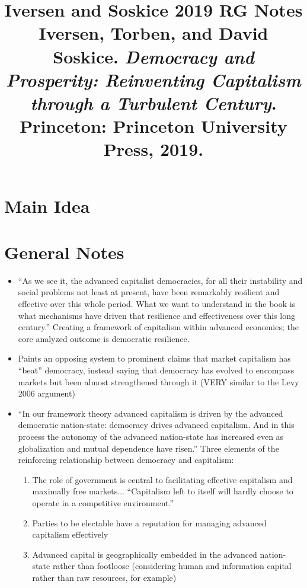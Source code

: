 \documentclass[12pt]{article}
\title{\textbf{Iversen and Soskice 2019 RG Notes}\\
\large Iversen, Torben, and David Soskice. \textit{Democracy and Prosperity: Reinventing Capitalism through a Turbulent Century}.\\
Princeton: Princeton University Press, 2019.}
\author{}
\date{}
\begin{document}
\maketitle

\section{Main Idea}



\section{General Notes}

\begin{itemize}[leftmargin=*, itemsep=4pt]
    \item ``As we see it, the advanced capitalist democracies, for all their instability and social problems not least at present, have been remarkably resilient and effective over this whole period. What we want to understand in the book is what mechanisms have driven that resilience and effectiveness over this long century.'' Creating a framework of capitalism within advanced economies; the core analyzed outcome is democratic resilience.
    \item Paints an opposing system to prominent claims that market capitalism has ``beat'' democracy, instead saying that democracy has evolved to encompass markets but been almost strengthened through it (VERY similar to the Levy 2006 argument)
    \item ``In our framework theory advanced capitalism is driven by the advanced democratic nation-state: democracy drives advanced capitalism. And in this process the autonomy of the advanced nation-state has increased even as globalization and mutual dependence have risen.'' Three elements of the reinforcing relationship between democracy and capitalism:
    \begin{enumerate}
        \item The role of government is central to facilitating effective capitalism and maximally free markets... ``Capitalism left to itself will hardly choose to operate in a competitive environment.''
        \item Parties to be electable have a reputation for managing advanced capitalism effectively
        \item Advanced capital is geographically embedded in the advanced nation-state rather than footloose (considering human and information capital rather than raw resources, for example)

\end{enumerate}
\end{itemize}
\end{document}
